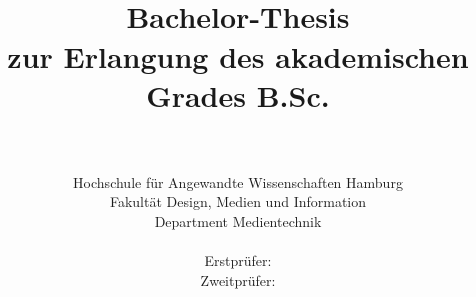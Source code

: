 
\title{\titel\\[2ex]
\LARGE Bachelor-Thesis\\
\large zur Erlangung des akademischen Grades B.Sc.\\[1.5ex]
\LARGE \vorname~\nachname\\[0.5ex] 
\large \matrikelnummer
}

\author{
\large{}\hspace{1ex}
\parbox[b]{11.2cm}{\sffamily\large%
Hochschule f\"ur Angewandte Wissenschaften Hamburg\\[-0.2ex]
Fakult\"at Design, Medien und Information\\[-0.2ex]
Department Medientechnik
}\\[6ex]
\sffamily\large Erstpr\"ufer: \erstpruef\\[0.5ex]
\sffamily\large Zweitpr\"ufer: \zweitpruef}

